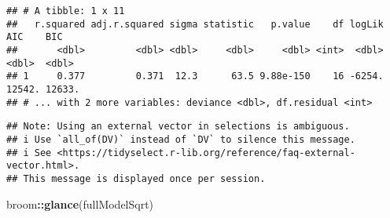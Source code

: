 \documentclass[
]{article}
\newenvironment{Shaded}{\begin{snugshade}}{\end{snugshade}}
\newcommand{\CommentTok}[1]{\textcolor[rgb]{0.56,0.35,0.01}{\textit{#1}}}
\newcommand{\DataTypeTok}[1]{\textcolor[rgb]{0.13,0.29,0.53}{#1}}
\newcommand{\KeywordTok}[1]{\textcolor[rgb]{0.13,0.29,0.53}{\textbf{#1}}}
\newcommand{\NormalTok}[1]{#1}
\newcommand{\OperatorTok}[1]{\textcolor[rgb]{0.81,0.36,0.00}{\textbf{#1}}}
\newcommand{\StringTok}[1]{\textcolor[rgb]{0.31,0.60,0.02}{#1}}
\begin{document}
\begin{Shaded}
\end{Shaded}

\begin{verbatim}
## # A tibble: 1 x 11
##   r.squared adj.r.squared sigma statistic   p.value    df logLik    AIC    BIC
##       <dbl>         <dbl> <dbl>     <dbl>     <dbl> <int>  <dbl>  <dbl>  <dbl>
## 1     0.377         0.371  12.3      63.5 9.88e-150    16 -6254. 12542. 12633.
## # ... with 2 more variables: deviance <dbl>, df.residual <int>
\end{verbatim}

\begin{Shaded}
\end{Shaded}

\begin{verbatim}
## Note: Using an external vector in selections is ambiguous.
## i Use `all_of(DV)` instead of `DV` to silence this message.
## i See <https://tidyselect.r-lib.org/reference/faq-external-vector.html>.
## This message is displayed once per session.
\end{verbatim}

\begin{Shaded}
\begin{Highlighting}[]
\NormalTok{broom}\OperatorTok{::}\KeywordTok{glance}\NormalTok{(fullModelSqrt)}
\end{Highlighting}
\end{Shaded}
\end{document}
